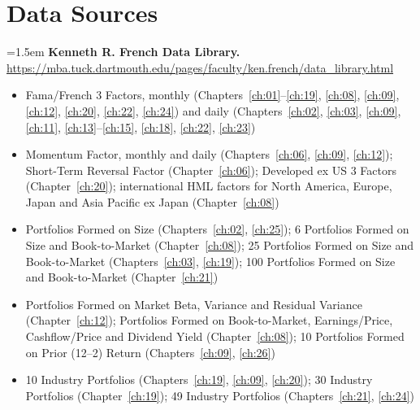 \chapter*{Data Sources}
\label{datasources}


\begingroup
\small
\sloppy
\setlength{\parindent}{0pt}
\setlength{\parskip}{4pt}

\hangindent=1.5em \textbf{Kenneth R. French Data Library.} \url{https://mba.tuck.dartmouth.edu/pages/faculty/ken.french/data_library.html}
\begin{itemize}\setlength{\itemsep}{0pt}\setlength{\parskip}{0pt}
  \item Fama/French 3 Factors, monthly (Chapters~\ref{ch:01}--\ref{ch:19}, \ref{ch:08}, \ref{ch:09}, \ref{ch:12}, \ref{ch:20}, \ref{ch:22}, \ref{ch:24}) and daily (Chapters~\ref{ch:02}, \ref{ch:03}, \ref{ch:09}, \ref{ch:11}, \ref{ch:13}--\ref{ch:15}, \ref{ch:18}, \ref{ch:22}, \ref{ch:23})
  \item Momentum Factor, monthly and daily (Chapters~\ref{ch:06}, \ref{ch:09}, \ref{ch:12}); Short-Term Reversal Factor (Chapter~\ref{ch:06}); Developed ex US 3 Factors (Chapter~\ref{ch:20}); international HML factors for North America, Europe, Japan and Asia Pacific ex Japan (Chapter~\ref{ch:08})
  \item Portfolios Formed on Size (Chapters~\ref{ch:02}, \ref{ch:25}); 6 Portfolios Formed on Size and Book-to-Market (Chapter~\ref{ch:08}); 25 Portfolios Formed on Size and Book-to-Market (Chapters~\ref{ch:03}, \ref{ch:19}); 100 Portfolios Formed on Size and Book-to-Market (Chapter~\ref{ch:21})
  \item Portfolios Formed on Market Beta, Variance and Residual Variance (Chapter~\ref{ch:12}); Portfolios Formed on Book-to-Market, Earnings/Price, Cashflow/Price and Dividend Yield (Chapter~\ref{ch:08}); 10 Portfolios Formed on Prior (12--2) Return (Chapters~\ref{ch:09}, \ref{ch:26})
  \item 10 Industry Portfolios (Chapters~\ref{ch:19}, \ref{ch:09}, \ref{ch:20}); 30 Industry Portfolios (Chapter~\ref{ch:19}); 49 Industry Portfolios (Chapters~\ref{ch:21}, \ref{ch:24})
\end{itemize}

